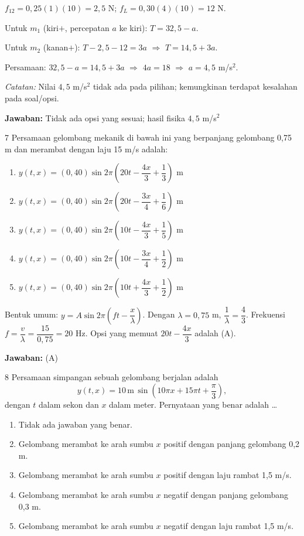 \documentclass[11pt]{article}
\newenvironment{pil}{%
  \begin{enumerate}[label=(\Alph*),leftmargin=*,itemsep=1pt,topsep=3pt]}%
  {\end{enumerate}}
\newcommand{\jawaban}[1]{%
  \noindent\colorbox{gold!30}{\parbox{\dimexpr\linewidth-2\fboxsep\relax}{%
    \textbf{Jawaban:} #1}}\par\smallskip}
\begin{document}
\begin{pembox}
$f_{12}=0{,}25(1)(10)=2{,}5$ N; $f_L=0{,}30(4)(10)=12$ N.

Untuk $m_1$ (kiri$+$, percepatan $a$ ke kiri): $T=32{,}5-a$.

Untuk $m_2$ (kanan$+$): $T-2{,}5-12=3a$ $\Rightarrow$ $T=14{,}5+3a$.

Persamaan: $32{,}5-a=14{,}5+3a$ $\Rightarrow$ $4a=18$ $\Rightarrow$ $a=4{,}5$ m/s$^2$.

\textit{Catatan:} Nilai $4{,}5$ m/s$^2$ tidak ada pada pilihan; kemungkinan terdapat kesalahan pada soal/opsi.
\jawaban{Tidak ada opsi yang sesuai; hasil fisika $4{,}5$ m/s$^2$}
\end{pembox}

\begin{soal}{7}
Persamaan gelombang mekanik di bawah ini yang berpanjang gelombang
0,75 m dan merambat dengan laju 15 m/s adalah:
\begin{pil}
  \item $y(t,x)=(0{,}40)\sin 2\pi\!\left(20t-\dfrac{4x}{3}+\dfrac{1}{3}\right)$ m
  \item $y(t,x)=(0{,}40)\sin 2\pi\!\left(20t-\dfrac{3x}{4}+\dfrac{1}{6}\right)$ m
  \item $y(t,x)=(0{,}40)\sin 2\pi\!\left(10t-\dfrac{4x}{3}+\dfrac{1}{5}\right)$ m
  \item $y(t,x)=(0{,}40)\sin 2\pi\!\left(10t-\dfrac{3x}{4}+\dfrac{1}{2}\right)$ m
  \item $y(t,x)=(0{,}40)\sin 2\pi\!\left(10t+\dfrac{4x}{3}+\dfrac{1}{2}\right)$ m
\end{pil}
\end{soal}

\begin{pembox}
Bentuk umum: $y=A\sin 2\pi\!\left(ft-\dfrac{x}{\lambda}\right)$. Dengan $\lambda=0{,}75$ m, $\dfrac{1}{\lambda}=\dfrac{4}{3}$. Frekuensi $f=\dfrac{v}{\lambda}=\dfrac{15}{0{,}75}=20$ Hz. Opsi yang memuat $20t-\dfrac{4x}{3}$ adalah (A).
\jawaban{(A)}
\end{pembox}

\begin{soal}{8}
Persamaan simpangan sebuah gelombang berjalan adalah
\[
  y(t,x) = 10\,\text{m}\,\sin\!\left(10\pi x + 15\pi t + \frac{\pi}{3}\right),
\]
dengan $t$ dalam sekon dan $x$ dalam meter. Pernyataan yang benar adalah \ldots
\begin{pil}
  \item Tidak ada jawaban yang benar.
  \item Gelombang merambat ke arah sumbu $x$ positif dengan panjang gelombang 0,2 m.
  \item Gelombang merambat ke arah sumbu $x$ positif dengan laju rambat 1,5 m/s.
  \item Gelombang merambat ke arah sumbu $x$ negatif dengan panjang gelombang 0,3 m.
  \item Gelombang merambat ke arah sumbu $x$ negatif dengan laju rambat 1,5 m/s.
\end{pil}
\end{soal}
\end{document}
